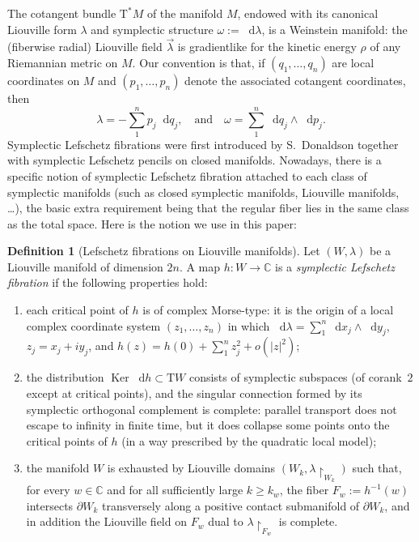 \documentclass[10pt]{amsart}
\newcommand{\C}{{\mathbb C}}
\newcommand{\Ker}{\operatorname{Ker}}
\newcommand{\etc}{,\ldots,}
\newcommand{\sT}{\mathrm{T}^\ast}
\newcommand{\rT}{\mathrm{T}}
\renewcommand{\d}{\mathop{}\!\mathrm d}
\newcommand{\dlambda}{\d\lambda}
\renewcommand{\dh}{\d h}
\newcommand{\dq}{\d q}
\newcommand{\dx}{\d x}
\newcommand{\dy}{\d y}
\newcommand{\de}{\mathrel{:=}}
\newcommand{\rst}[1]{{\upharpoonright}_{\!#1}}
\let\del\partial
\let\on\colon
\theoremstyle{plain}
\theoremstyle{definition}
\newtheorem{definition}[theorem]{Definition}
\begin{document}
The cotangent bundle $\sT M$ of the manifold $M$, endowed with its canonical
Liouville form $\lambda$ and symplectic structure $\omega \de \dlambda$, is a
Weinstein manifold: the (fiberwise radial) Liouville field $\vec\lambda$ is
gradientlike for the kinetic energy $\rho$ of any Riemannian metric on $M$. Our
convention is that, if $(q_1 \etc q_n)$ are local coordinates on $M$ and $(p_1
\etc p_n)$ denote the associated cotangent coordinates, then
\[
\lambda = - \sum_1^n p_j \dq_j, \quad \text{and} \quad
 \omega = \sum_1^n \dq_j \wedge \d p_j.
\]
Symplectic Lefschetz fibrations were first introduced by S.~Donaldson \cite{Do}
together with symplectic Lefschetz pencils on closed manifolds. Nowadays, there
is a specific notion of symplectic Lefschetz fibration attached to each class of
symplectic manifolds (such as closed symplectic manifolds, Liouville manifolds,
\ldots), the basic extra requirement being that the regular fiber lies in the
same class as the total space. Here is the notion we use in this paper:

\begin{definition}[Lefschetz fibrations on Liouville manifolds] \label{d:slf}
Let $(W,\lambda)$ be a Liouville manifold of dimension $2n$. A map $h \on W \to
\C$ is a \emph{symplectic Lefschetz fibration} if the following properties hold:
\begin{enumerate}
\item\label{up1}
each critical point of $h$ is of complex Morse-type: it is the origin of a local
complex coordinate system $(z_1 \etc z_n)$ in which $\dlambda = \sum_1^n \dx_j
\wedge \dy_j$, $z_j = x_j+iy_j$, and $h(z) = h(0) + \sum_1^n z_j^2 + o(|z|^2)$;
\item\label{up2}
the distribution $\Ker\dh \subset \rT W$ consists of symplectic subspaces (of
corank~$2$ except at critical points), and the singular connection formed by its
symplectic orthogonal complement is complete: parallel transport does not escape
to infinity in finite time, but it does collapse some points onto the critical
points of $h$ (in a way prescribed by the quadratic local model);
\item\label{up3}
the manifold $W$ is exhausted by Liouville domains $(W_k, \lambda \rst{ W_k })$
such that, for every $w \in \C$ and for all sufficiently large $k \ge k_w$, the
fiber $F_w \de h^{-1}(w)$ intersects $\del W_k$ transversely along a positive
contact submanifold of $\del W_k$, and in addition the Liouville field on $F_w$
dual to $\lambda \rst{ F_w }$ is complete.
\end{enumerate}
\end{definition}
\end{document}
